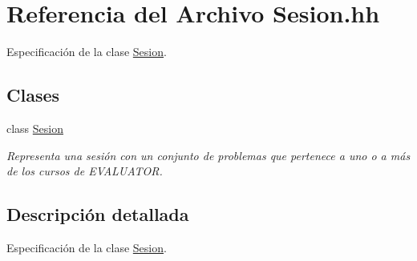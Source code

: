 \hypertarget{_sesion_8hh}{}\section{Referencia del Archivo Sesion.\+hh}
\label{_sesion_8hh}


Especificación de la clase \mbox{\hyperlink{class_sesion}{Sesion}}.  


\subsection*{Clases}
\begin{DoxyCompactItemize}
\item 
class \mbox{\hyperlink{class_sesion}{Sesion}}
\begin{DoxyCompactList}\small\item\em Representa una sesión con un conjunto de problemas que pertenece a uno o a más de los cursos de E\+V\+A\+L\+U\+A\+T\+OR. \end{DoxyCompactList}\end{DoxyCompactItemize}


\subsection{Descripción detallada}
Especificación de la clase \mbox{\hyperlink{class_sesion}{Sesion}}. 

